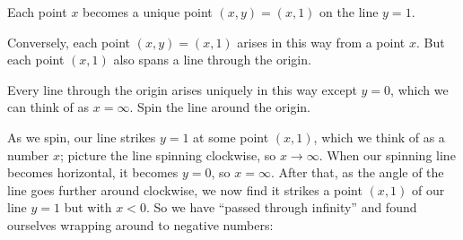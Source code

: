 Each point \(x\) becomes a unique point \((x,y)=(x,1)\) on the line \(y=1\).
\begin{center}
\end{center}
Conversely, each point \((x,y)=(x,1)\) arises in this way from a point \(x\).
But each point \((x,1)\) also spans a line through the origin.
\begin{center}
\end{center}
Every line through the origin arises uniquely in this way except \(y=0\), which we can think of as \(x=\infty\).
Spin the line around the origin.
\begin{center}

\end{center}
As we spin, our line strikes \(y=1\) at some point \((x,1)\), which we think of as a number \(x\); picture the line spinning clockwise, so \(x\to\infty\).
When our spinning line becomes horizontal, it becomes \(y=0\), so \(x=\infty\).
After that, as the angle of the line goes further around clockwise, we now find it strikes a point \((x,1)\) of our line \(y=1\) but with \(x<0\).
So we have ``passed through infinity'' and found ourselves wrapping around to negative numbers:
\begin{center}

\end{center}

